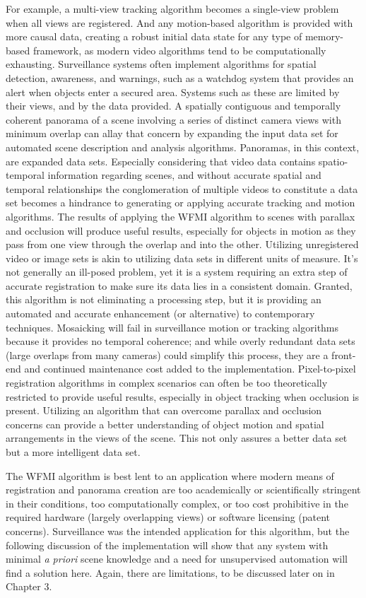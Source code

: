 For example, a multi-view tracking algorithm becomes a single-view problem when all views are registered. And any motion-based algorithm is provided with more causal data, creating a robust initial data state for any type of memory-based framework, as modern video algorithms tend to be computationally exhausting. Surveillance systems often implement algorithms for spatial detection, awareness, and warnings, such as a watchdog system that provides an alert when objects enter a secured area. Systems such as these are limited by their views, and by the data provided. A spatially contiguous and temporally coherent panorama of a scene involving a series of distinct camera views with minimum overlap can allay that concern by expanding the input data set for automated scene description and analysis algorithms. Panoramas, in this context, are expanded data sets. Especially considering that video data contains spatio-temporal information regarding scenes, and without accurate spatial and temporal relationships the conglomeration of multiple videos to constitute a data set becomes a hindrance to generating or applying accurate tracking and motion algorithms. The results of applying the WFMI algorithm to scenes with parallax and occlusion will produce useful results, especially for objects in motion as they pass from one view through the overlap and into the other. Utilizing unregistered video or image sets is akin to utilizing data sets in different units of measure. It's not generally an ill-posed problem, yet it is a system requiring an extra step of accurate registration to make sure its data lies in a consistent domain. Granted, this algorithm is not eliminating a processing step, but it is providing an automated and accurate enhancement (or alternative) to contemporary techniques. Mosaicking will fail in surveillance motion or tracking algorithms because it provides no temporal coherence; and while overly redundant data sets (large overlaps from many cameras) could simplify this process, they are a front-end and continued maintenance cost added to the implementation. Pixel-to-pixel registration algorithms in complex scenarios can often be too theoretically restricted to provide useful results, especially in object tracking when occlusion is present. Utilizing an algorithm that can overcome parallax and occlusion concerns can provide a better understanding of object motion and spatial arrangements in the views of the scene. This not only assures a better data set but a more intelligent data set.

The WFMI algorithm is best lent to an application where modern means of registration and panorama creation are too academically or scientifically stringent in their conditions, too computationally complex, or too cost prohibitive in the required hardware (largely overlapping views) or software licensing (patent concerns). Surveillance was the intended application for this algorithm, but the following discussion of the implementation will show that any system with minimal \textit{a priori} scene knowledge and a need for unsupervised automation will find a solution here. Again, there are limitations, to be discussed later on in Chapter 3.





